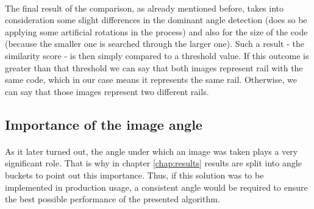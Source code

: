 \paragraph{}
The final result of the comparison, as already mentioned before, takes into consideration some slight differences in the dominant angle detection (does so be applying some artificial rotations in the process) and also for the size of the code (because the smaller one is searched through the larger one). Such a result - the similarity score - is then simply compared to a threshold value. If this outcome is greater than that threshold we can say that both images represent rail with the same code, which in our case means it represents the same rail. Otherwise, we can say that those images represent two different rails.

\subsection{Importance of the image angle} \label{subsect:angle_importance}
\paragraph{}
As it later turned out, the angle under which an image was taken plays a very significant role. That is why in chapter \autoref{chap:results} results are split into angle buckets to point out this importance. Thus, if this solution was to be implemented in production usage, a consistent angle would be required to ensure the best possible performance of the presented algorithm.










